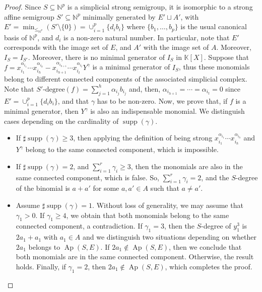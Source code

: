 \documentclass[a4paper,11pt]{article}
\def\N{\mathbb{N}}
\def\k{\mathbb{K}}
\def\Ap{\operatorname{Ap}}
\def\supp{\operatorname{supp}}
\begin{document}
{\begin{proof}
Since $S\subseteq \N^p$ is a simplicial strong semigroup, it is isomorphic to a strong affine semigroup $S'\subseteq \N^p$ minimally generated by $E'\sqcup A'$, with  $E'=\min_{\le_{\N^p}}(S'\setminus \{0\})=\cup_{i=1}^p\{d_i b_i\}$ where $\{b_1,\ldots ,b_p\}$ is the usual canonical basis of $\N^p$, and $d_i$ is a non-zero natural number. In particular, note that $E'$ corresponds with the image set of $E$, and $A'$ with the image set of $A$. Moreover, $I_S=I_{S'}$. Moreover, there is no minimal generator of $I_S$ in $\k[X]$.
Suppose that $f=x_{i_1}^{\alpha_{i_1}}\cdots x_{i_h}^{\alpha_{i_h}} -x_{i_{h+1}}^{\alpha_{i_{h+1}}}\cdots x_{i_t}^{\alpha_{i_t}}Y^\gamma$ is a minimal generator of $I_S$, thus these monomials belong to different connected components of the associated simplicial complex. Note that $S'\text{-degree}(f) = \sum_{j = 1}^h \alpha_{i_j}b_{i_j}$ and, then,  $\alpha_{i_{h+1}}=\cdots =\alpha_{i_{t}} =0$ since $E'=\cup_{i=1}^p\{d_i b_i\}$, and that $\gamma$ has to be non-zero.
Now, we prove that, if $f$ is a minimal generator, then $Y^\gamma$ is also an indispensable monomial.
We distinguish cases depending on the cardinality of $\supp(\gamma)$.
\begin{itemize}
    \item If $\sharp\supp(\gamma)\geq 3$, then applying the definition of being strong  $x_{i_1}^{\alpha_{i_1}}\cdots x_{i_h}^{\alpha_{i_h}}$ and $Y^\gamma$ belong to the same connected component, which is impossible.
    \item If $\sharp\supp(\gamma)= 2$, and $\sum _{i=1}^r \gamma_i\geq 3$, then the monomials are also in the same connected component, which is false. So, $\sum _{i=1}^r \gamma_i=2$, and the $S$-degree of the binomial is $a+a'$ for some $a,a'\in A$ such that $a\neq a'$.
    \item Assume $\sharp\supp(\gamma)= 1$. Without loss of generality, we may assume that $\gamma_1 > 0$. If $\gamma_1\geq 4$, we obtain that both monomials belong to the same connected component, a contradiction. If $\gamma_1= 3$, then the  $S$-degree of $y_1^3$ is $2a_1+a_1$ with $a_1\in A$ and we distinguish two situations depending on whether $2a_1$ belongs to $\Ap(S,E)$.
    If $2a_1\notin \Ap(S,E)$, then we conclude that both monomials are in the same connected component. Otherwise, the result holds. Finally, if $\gamma_1=2$, then $2a_1\notin\Ap(S, E)$, which completes the proof.
\end{itemize}
\end{proof}

}
\end{document}

